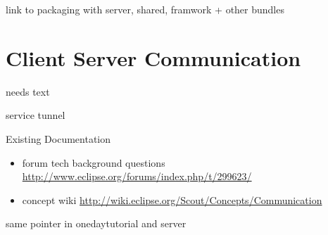 \documentclass[a4paper,10pt,twoside]{book}
\begin{document}
link to packaging with server, shared, framwork + other bundles

\section{Client Server Communication}
needs text

service tunnel

\noindent Existing Documentation
\begin{itemize}
  \item forum tech background questions \url{http://www.eclipse.org/forums/index.php/t/299623/}
  \item concept wiki \url{http://wiki.eclipse.org/Scout/Concepts/Communication}
\end{itemize}

same pointer in onedaytutorial and server


\ifx\wholebook\relax\else
   
   
\end{document}
